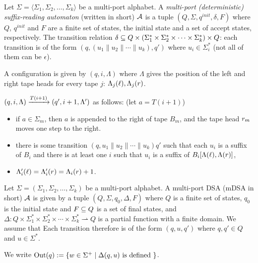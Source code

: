 \begin{definition} Let
 $\Sigma = \langle \Sigma_1, \Sigma_2, \dots, \Sigma_k \rangle$ be a
 multi-port alphabet. A \emph{multi-port (deterministic)
   suffix-reading automaton} (written in short) $\mathcal{A}$ is a
 tuple $(Q, \Sigma, q^{init}, \delta, F)$ where $Q$, $q^{init}$ and
 $F$ are a finite set of states, the initial state and a set of
 accept states, respectively. The transition relation
 $\delta \subseteq Q \times (\Sigma_1^* \times \Sigma_2^* \times \cdots
 \times \Sigma_k^*) \times Q$: each transition is of the form
 $(q, (u_1 \parallel u_2 \parallel \cdots \parallel u_k), q')$ where
 $u_i \in \Sigma_i^*$ (not all of them can be $\epsilon$).
\end{definition}%


A configuration is given by $(q, i, \Lambda)$ where $\Lambda$ gives the position of the left and right tape heads for every tape $j$: $\Lambda_j(\ell), \Lambda_j(r)$.

$(q, i, \Lambda) \xrightarrow{T(i+1)} (q', i+1, \Lambda') $ as follows: (let $a = T(i+1)$)
\begin{itemize}
\item if $a \in \Sigma_m$, then $a$ is appended to the right of tape $B_m$, and the tape head $r_m$ moves one step to the right.
\item there is some transition $(q, u_1 \parallel u_2 \parallel \cdots \parallel u_k) q'$ such that each $u_i$ is a suffix of $B_i$ and there is at least one $i$ such that $u_i$ is a suffix of $B_i[\Lambda(\ell), \Lambda(r)]$,
\item $\Lambda'_i(\ell) = \Lambda'_i(r) = \Lambda_i(r) + 1$. 
\end{itemize}

\begin{definition}
    Let $\Sigma = (\Sigma_1, \Sigma_2, \dots, \Sigma_k)$ be a multi-port alphabet. A multi-port DSA (mDSA in short) $\mathcal{A}$ is given by a tuple $(Q, \Sigma, q_0, \Delta, F)$ where $Q$ is a finite set of states, $q_0$ is the initial state and $F \subseteq Q$ is a set of final states, and $\Delta : Q \times \Sigma_1^* \times \Sigma_2^* \times \cdots \times \Sigma_k^* \rightharpoonup Q$ is a  partial function with a finite domain. We assume that  Each transition therefore is of the form $(q, u, q')$ where $q, q' \in Q$ and $u \in \Sigma^*$. 
    
    We write $\operatorname{Out}(q) := \{ w \in \Sigma^+ \mid \Delta(q, u) \text{ is defined }\}$.
    \end{definition}

